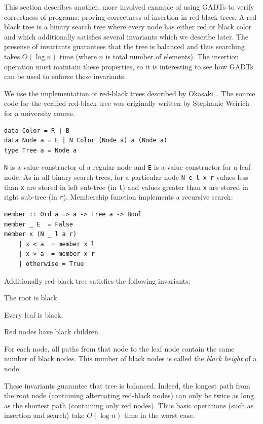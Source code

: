 \documentclass{tmr}
\newcommand{\italic}[1]{\textit{#1}}
\begin{document}
This section describes another, more involved example of using GADTs to verify correctness of programs: proving correctness of insertion in red-black trees. A red-black tree is a binary search tree where every node has either red or black color and which additionally satisfies several invariants which we describe later. The presense of invariants guarantees that the tree is balanced and thus searching takes $O (\log n)$ time (where $n$ is total number of elements). The insertion operation must maintain these properties, so it is interesting to see how GADTs can be used to enforse these invariants.

We use the implementation of red-black trees described by Okasaki~\cite{okasaki_red_black_trees}. The source code for the verified red-black tree was originally written by Stephanie Weirich~\cite{weirich_dependently_typed} for a university course.

\begin{Verbatim}
data Color = R | B
data Node a = E | N Color (Node a) a (Node a) 
type Tree a = Node a
\end{Verbatim}

\verb|N| is a value constructor of a regular node and \verb|E| is a value constructor for a leaf node. As in all binary search trees, for a particular node \verb|N c l x r| values less than \verb|x| are stored in left sub-tree (in \verb|l|) and values greater than \verb|x| are stored in right sub-tree (in \verb|r|). Membership function implements a recursive search:

\begin{Verbatim}
member :: Ord a => a -> Tree a -> Bool
member _ E  = False
member x (N _ l a r)
    | x < a  = member x l
    | x > a  = member x r
    | otherwise = True
\end{Verbatim}

Additionally red-black tree satisfies the following invariants:

\begin{longenum}
\item The root is black.
\item Every leaf is black.
\item Red nodes have black children.
\item For each node, all paths from that node to the leaf node contain the same number of black nodes. This number of black nodes is called the \italic{black height} of a node.
\end{longenum}

These invariants guarantee that tree is balanced. Indeed, the longest path from the root node (containing alternating red-black nodes) can only be twice as long as the shortest path (containing only red nodes). Thus basic operations (such as insertion and search) take $O(\log n)$ time in the worst case.
\end{document}
